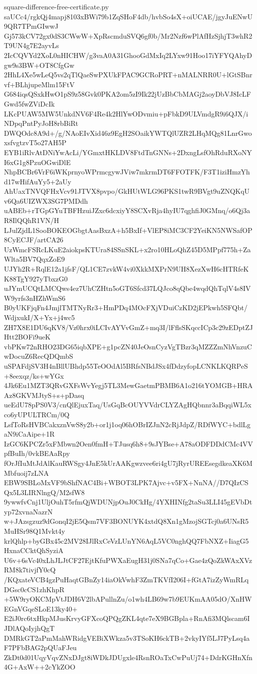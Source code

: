 \documentclass[11pt]{article}
\theoremstyle{definition}
\theoremstyle{remark}
\begin{document}
\begin{filecontents*}[overwrite]{square-difference-free-certificate.py}
saUCc4/rgkQj4mapj8103xBWi79b1ZqSHoF4db/hvbSo4sX+oiUCAE/jgyJuENwU9QR7TPmGIwwJ
Gj573kCV72gx0dS3CWwW+XpRscmduSVQ6gf0b/Mr2Nzf6wPlAfHzSjhjT3whR2T9UN4g7E2ayvLs
2IcCQVYd2XoL0nHICHW/g3vaA0A31GhooGdMxIq2LYxw91Hoo17iYFYQAhyDgw9s3BW+OT8CfgGw
2HhL4Xe5wLeQ5vs2qTlQaeSwPXUkFPAC9GCRoPRT+nMALNRR0U+lGtSBnrvf+BLhjupeMlm15FtV
G684iqsQSxkHwO1pS9z58Gvk0PKA2om5zI9Ik22jUzBbCbMAGj2aoyDbVJ8IcLFGwd5fwZViDcIk
LKcPUAW5MW5UnkdNV6F4Re4k2HlYwODvmiu+pFbkD9ULVmdgR9i6QJX/iNDpqPntPyJoH8rbBiRt
DWQOdc8A9d+/g/NAoEIvXid46z9EgH2SOaikYWTQlUZR2LHqMQg81LnrGwoxsfvgtzvT5o27AH5P
EYB1iRlvAtDNiYwAcLi/YGmxtHKLDV8FtdTnGNNs+2DxngLsfOhRduRXoNYI6xG1g8PzuOGwiDlE
NhpBCBr6VrF6iWKprnyoWPrmcgywJViw7mkrmDT6FFOTFK/F3T1iziHmzYhd17wHifAuYy5+2aUy
AhUaxTNVQFHxVcv91JTVX8pvpo/GkHUtWLG96PKS1twR9BVgt9uZNQKqUv6Qa6UIZWX3SG7PMDdh
uABEb+rTGpGYuTBFHzuiJZxc6dcxiyY8SCXvRja4hyIU7qghfiJ0GMnq/o6Qj3aR8IlQQhR1VN/H
LJulZjdL1SooBOKEOGbgtAasBxzA+h5BxIf+VlEP8iMC3CF2YeiKN5NWSafOP8CyECJF/artCA26
UzWmcFSRcLKuE2aiokpsKTUra84SSnSKL+x2ro10HLoQhZ45D5MPpf775h+ZaWlta5BV7QqxZoE9
UJYh2R+RqlE12a1jfsF/QL1CE7zvkW4vi0XkkMXPrN9UH8XezXwH6cHTRfeKK88TgY927yTbxzG0
uJYmUCQtLMCQws4ez7UhCZHtn5oGT6Sfcd37LQJco8qQbe4wqdQhTqlV4s8IVW9yrfs3nHZhWmS6
B0yUKFjqFn4JmjlTMTNyRr3+HmPDq4MOcFXjVDuiCzKD2jEPkwh5SFQbt/WdjxukI/X+Yx+j4wc5
ZH7X8E1DU6qKV8/Vz0hrx0iLCIvAYVvGmZ+mq3I/lFflsSKqccICp3c29zEDptZJHtt2BOFi9ueK
vbPKw72nRHO23DG65iqbXPE+g1pcZN40JeOsnCyzVgTBzr3qMZZZmNhVnzuCwDocuZ6RecQDQmbS
uSPAFdjSV3H4nBllUBhdp55TeOOdAl5BRfsNBdJSx4fDdzyfopLCNKLKQRPeS+8eexqz/ks+wYGx
4Jk6Eu1MZT3QRvGXFsWvYegj5TL3MewGaetmPBMB6A1o216tYOMGB+HRAAz8GKVMJtyS+s+pDasq
ueEdU78pPS0V3/cnQlEjuxTaq/UsGqBcOUYVVdrCLYZAgHQbnnr3aBqqiWL5xco6yUPULTRCm/0Q
LsfToRsHVBCakxznVwS8y2b+or1j1oq06hOBrIZJnN2cRjJdpZ/RDfWYC+bdlLgaN9iCaAipe+1R
IzGC6KPCZr5xFMbwn2Oen0fmH+TJusq6h8+9sJYBse+A78aODFDDdCMc4VVpfBuIh/0vkBEAaRpy
fOrJfIuMtJdAlKauRWSgy4JnE5kUrAAKgwzvee6ri4gU7jRyrUREEsegdkeaXK6MMbfuoij7zLNA
EBW9SBLoMxVF9bShfNAC4Bi+WBOT3LPK7Ajvc+v5FX+NnNA//D7QIzCSQx5L3LIRNlngQ/M2sfW8
9ywwfvCnj1UljOuhT5rfmQjWDUNjpOuJ0CkHg/4YXHINfg2taSu3LLI45gEVbDtyp72xvnaNazrN
w+JAzsgzuz9dGonqI2jE5Qsm7VF3BONUYK4xtdQ8Xn1gMzojSGTcj0a6UNsR5MuHSr98Q1Mvkt4y
krlQhlp+byGBx45c2MV28IJlRxCeVzLUnYN6AqL5VC0nghQQ7FbNXZ+IiagG5HxnaCCktQhSyziA
U6v+6sVc40xLhJLJtCF27EjtKfuPWXaEugH31j0SNa7qCo+Gae4zQoZkWAxXVzRM8k7tivjfY0cQ
/KQxateVCB4gzPuHaqtGBnZy14iaOkVwhF3ZmTKVfI206I+fGtA7izZyWmRLqDGsc0cCS1zhKhpR
+5W9ryOKCMpVtJDH6V2lbAPullnZu/o1wh4LB69w7b9EUKmAA05dO/XnHWEGnVGqeSLoE13ky40+
E2iJ0rc6txHkpMJusKrvyGFXcoQPQgZKL4qte7eX9BGBpla+RnAfi3MQlscam6IJDlAQoIyjhQgT
DMRkGT2aPmMahWRidgVEBiXWkza5v3TSoKH6ckTB+2vkyIYf5LJ7PyLsq4aF7PFbBAG2pQUaFJeu
ZkDt0d01UqyVqvZNxDJgt8iWDkJDUgxle4RsnROaTxCwPuUj74+DdrKGHnXfn4G+AxW++2cYkZOO

\end{filecontents*}
\end{document}
